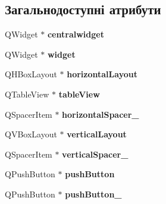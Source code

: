 \subsection*{Загальнодоступні атрибути}
\begin{DoxyCompactItemize}
\item 
\hypertarget{classUi__GoodsMgmtScreen_a51b13e31b350281491052f3d5971ae60}{Q\-Widget $\ast$ {\bfseries centralwidget}}\label{classUi__GoodsMgmtScreen_a51b13e31b350281491052f3d5971ae60}

\item 
\hypertarget{classUi__GoodsMgmtScreen_a886d6c0b18e00ae84565e97d7e7a4315}{Q\-Widget $\ast$ {\bfseries widget}}\label{classUi__GoodsMgmtScreen_a886d6c0b18e00ae84565e97d7e7a4315}

\item 
\hypertarget{classUi__GoodsMgmtScreen_aeae0577797c24c57d957d776a66362ad}{Q\-H\-Box\-Layout $\ast$ {\bfseries horizontal\-Layout}}\label{classUi__GoodsMgmtScreen_aeae0577797c24c57d957d776a66362ad}

\item 
\hypertarget{classUi__GoodsMgmtScreen_a15a34ca1bb6de6ee947406d7e81aea7e}{Q\-Table\-View $\ast$ {\bfseries table\-View}}\label{classUi__GoodsMgmtScreen_a15a34ca1bb6de6ee947406d7e81aea7e}

\item 
\hypertarget{classUi__GoodsMgmtScreen_aa94a6f911507c470f171ca535d86e267}{Q\-Spacer\-Item $\ast$ {\bfseries horizontal\-Spacer\-\_}}\label{classUi__GoodsMgmtScreen_aa94a6f911507c470f171ca535d86e267}

\item 
\hypertarget{classUi__GoodsMgmtScreen_a6203c3363ae73c2a34b473fad6f85df5}{Q\-V\-Box\-Layout $\ast$ {\bfseries vertical\-Layout}}\label{classUi__GoodsMgmtScreen_a6203c3363ae73c2a34b473fad6f85df5}

\item 
\hypertarget{classUi__GoodsMgmtScreen_a7d598759631c0e67beb8ba2546b475ce}{Q\-Spacer\-Item $\ast$ {\bfseries vertical\-Spacer\-\_}}\label{classUi__GoodsMgmtScreen_a7d598759631c0e67beb8ba2546b475ce}

\item 
\hypertarget{classUi__GoodsMgmtScreen_a6d94c562fc4812065faf476820c604e0}{Q\-Push\-Button $\ast$ {\bfseries push\-Button}}\label{classUi__GoodsMgmtScreen_a6d94c562fc4812065faf476820c604e0}

\item 
\hypertarget{classUi__GoodsMgmtScreen_a65afa4141945ad4421e90546ca5ba25b}{Q\-Push\-Button $\ast$ {\bfseries push\-Button\-\_}}\label{classUi__GoodsMgmtScreen_a65afa4141945ad4421e90546ca5ba25b}


\end{DoxyCompactItemize}

